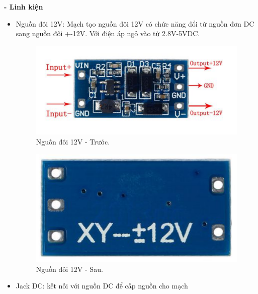 \documentclass[a4paper,12pt,oneside]{article}
\begin{document}
\textbf{- Linh kiện}
\begin{itemize}
\item	Nguồn đôi 12V: Mạch tạo nguồn đôi 12V có chức năng đổi từ nguồn đơn DC sang nguồn đôi +-12V. Với điện áp ngỏ vào từ 2.8V-5VDC.
\begin{figure}[H]
\centering
\begin{center}
\includegraphics[scale=.7]{hinh/PPM/ppm_12vtruoc.png}
\end{center}
\caption{Nguồn đôi 12V - Trước.}
\end{figure}
\begin{figure}[H]
\centering
\begin{center}
\includegraphics[scale=.4]{hinh/PPM/ppm_12vsau.png}
\end{center}
\caption{Nguồn đôi 12V - Sau.}
\end{figure}
\item	Jack DC: kết nối với nguồn DC để cấp nguồn cho mạch
\begin{figure}[H]
\centering
\begin{center}

\end{center}
\end{figure}
\end{itemize}
\end{document}
